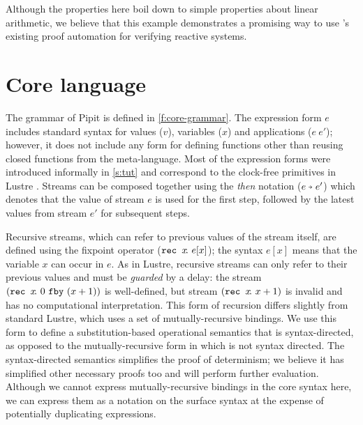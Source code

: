 \documentclass[sigplan,screen, review]{acmart}
\begin{document}
Although the properties here boil down to simple properties about linear arithmetic, we believe that this example demonstrates a promising way to use \fstar{}'s existing proof automation for verifying reactive systems.

\section{Core language}
\label{s:core}


% 
% 

The grammar of Pipit is defined in \autoref{f:core-grammar}.
The expression form $e$ includes standard syntax for values ($v$), variables ($x$) and applications ($e~e'$); however, it does not include any form for defining functions other than reusing closed functions from the \fstar{} meta-language.
Most of the expression forms were introduced informally in \autoref{s:tut} and correspond to the clock-free primitives in Lustre \cite{caspi1995functional}.
Streams can be composed together using the \emph{then} notation ($\xthen{e}{e'}$) which denotes that the value of stream $e$ is used for the first step, followed by the latest values from stream $e'$ for subsequent steps.

Recursive streams, which can refer to previous values of the stream itself, are defined using the fixpoint operator ($\texttt{rec~} x \!.~e[x]$); the syntax $e[x]$ means that the variable $x$ can occur in $e$.
As in Lustre, recursive streams can only refer to their previous values and must be \emph{guarded} by a delay: the stream $(\texttt{rec~} x \!.~0~\texttt{fby}~(x + 1))$ is well-defined, but stream $(\texttt{rec~} x \!.~x + 1)$ is invalid and has no computational interpretation.
This form of recursion differs slightly from standard Lustre, which uses a set of mutually-recursive bindings.
We use this form to define a substitution-based operational semantics that is syntax-directed, as opposed to the mutually-recursive form in \citet{caspi1995functional} which is not syntax directed.
The syntax-directed semantics simplifies the proof of determinism; we believe it has simplified other necessary proofs too and will perform further evaluation.
Although we cannot express mutually-recursive bindings in the core syntax here, we can express them as a notation on the surface syntax at the expense of potentially duplicating expressions.
\end{document}

